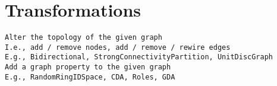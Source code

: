 
\section{Transformations}
\label{sec:transformations}


\begin{verbatim}
Alter the topology of the given graph
I.e., add / remove nodes, add / remove / rewire edges
E.g., Bidirectional, StrongConnectivityPartition, UnitDiscGraph
Add a graph property to the given graph
E.g., RandomRingIDSpace, CDA, Roles, GDA
\end{verbatim}
